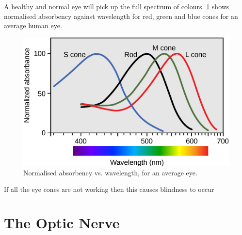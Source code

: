 A healthy and normal eye will pick up the full spectrum of colours.
 \ref{fig:wavelengths} shows normalised absorbency against wavelength
 for red, green and blue cones for an average human eye.

\begin{figure}[htbp]
  \centering
    \includegraphics{figures/wavelengths}
  \caption{Normalised absorbency vs. wavelength, for an average eye.}
  \label{fig:wavelengths}
\end{figure}

If all the eye cones are not working then this causes blindness to occur\cite{}

\section{The Optic Nerve}
